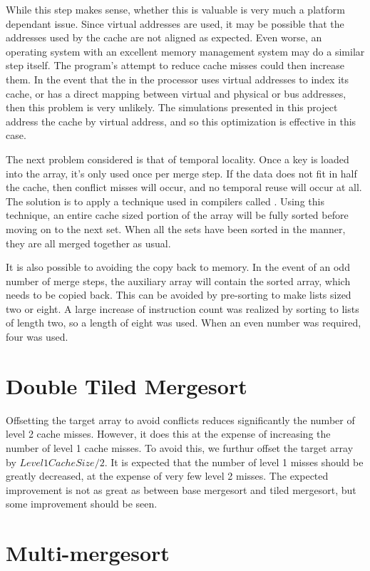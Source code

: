 While this step makes sense, whether this is valuable is very much a platform
dependant issue. Since virtual addresses are used, it may be possible that the
addresses used by the cache are not aligned as expected. Even worse, an
operating system with an excellent memory management system may do a similar
step itself. The program's attempt to reduce cache misses could then increase
them. In the event that the  in the processor uses
virtual addresses to index its cache, or has a direct mapping between virtual
and physical or bus addresses, then this problem is very unlikely. The
simulations presented in this project address the cache by virtual address, and
so this optimization is effective in this case.

The next problem considered is that of temporal locality. Once a key is loaded
into the array, it's only used once per merge step. If the data does not fit in
half the cache, then conflict misses will occur, and no temporal reuse will
occur at all. The solution is to apply a technique used in compilers called
. Using this technique, an entire cache sized portion of the array will
be fully sorted before moving on to the next set. When all the sets have been
sorted in the manner, they are all merged together as usual.

It is also possible to avoiding the copy back to memory. In the event of an odd
number of merge steps, the auxiliary array will contain the sorted array, which
needs to be copied back. This can be avoided by pre-sorting to make lists sized
two or eight. A large increase of instruction count was realized by sorting to
lists of length two, so a length of eight was used. When an even number was
required, four was used.

\section{Double Tiled Mergesort}
Offsetting the target array to avoid conflicts reduces significantly the number
of level 2 cache misses. However, it does this at the expense of increasing the
number of level 1 cache misses. To avoid this, we furthur offset the target
array by $Level1CacheSize/2$. It is expected that the number of level 1 misses
should be greatly decreased, at the expense of very few level 2 misses. The
expected improvement is not as great as between base mergesort and tiled
mergesort, but some improvement should be seen.

\section{Multi-mergesort}

